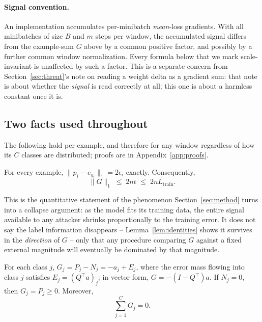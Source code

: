 \paragraph{Signal convention.}
An implementation accumulates per-minibatch \emph{mean}-loss gradients.
With all minibatches of size $B$ and $m$ steps per window, the accumulated
signal differs from the example-sum $G$ above by a common positive
factor, and possibly by a further common window normalization. Every
formula below that we mark scale-invariant is unaffected by such a
factor. This is a separate concern from Section~\ref{sec:threat}'s note on
reading a weight delta as a gradient sum: that note is about whether the
\emph{signal} is read correctly at all; this one is about a harmless
constant once it is.

\subsection{Two facts used throughout}
\label{sec:prelim-facts}

The following hold per example, and therefore for any window regardless
of how its $C$ classes are distributed; proofs are in
Appendix~\ref{app:proofs}.

\begin{lemma}
\label{lem:norm}
For every example, \(\|p_i - e_{y_i}\|_1 = 2\epsilon_i\) exactly.
Consequently,
\[
\|G\|_1 \;\leq\; 2n\bar\epsilon \;\leq\; 2n L_{\mathrm{train}}.
\]
\end{lemma}

This is the quantitative statement of the phenomenon Section~\ref{sec:method}
turns into a collapse argument: as the model fits its training data, the
entire signal available to any attacker shrinks proportionally to the
training error. It does not say the label information disappears --
Lemma~\ref{lem:identities} shows it survives in the \emph{direction} of
$G$ -- only that any procedure comparing $G$ against a fixed external
magnitude will eventually be dominated by that magnitude.

\begin{lemma}
\label{lem:identities}
For each class \(j\), \(G_j = P_j - N_j = -a_j + E_j\), where the error
mass flowing into class \(j\) satisfies \(E_j = (Q^{\top}a)_j\); in vector
form, \(G = -(I - Q^{\top})a\). If \(N_j = 0\), then
\(G_j = P_j \geq 0\). Moreover,
\[
\sum_{j=1}^{C} G_j = 0.
\]
\end{lemma}

